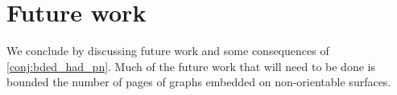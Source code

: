 \chapter{Future work}\label{chap:Future Work}
We conclude by discussing future work and some consequences of \cref{conj:bded_had_pn}. Much of the future work that will need to be done is bounded the number of pages of graphs embedded on non-orientable surfaces. 




